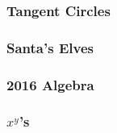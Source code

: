 \documentclass[titlepage=true]{scrartcl}
\begin{document}
    \subsubsection{Tangent Circles}
        \label{5-1-4}
        
    \newpage

    \subsubsection{Santa's Elves}
        \label{5-1-5}
        
    \newpage

    \subsubsection{2016 Algebra}
        \label{5-1-6}
        
    \newpage

    \subsubsection{\(x^y\)'s}
    \label{5-1-7}
    
\newpage
\end{document}
